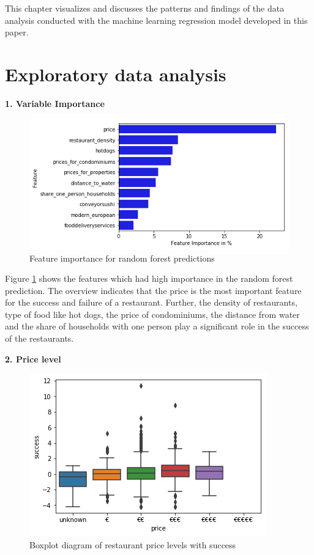\documentclass[a4paper, 11pt, oneside]{Thesis}  %
\begin{document}
This chapter visualizes and discusses the patterns and findings of the data analysis conducted with the machine learning regression model developed in this paper.

\section{Exploratory data analysis}
\label{Exploratory_data_analysis}

\textbf{1.	Variable Importance}

\begin{figure}[h]
\includegraphics[scale=0.7]{Figures/Exploratory/feature_importance_barplot.png}
\centering
\caption{Feature importance for random forest predictions}
\label{fig:feature_importance_barplot}
\end{figure}

Figure \ref{fig:feature_importance_barplot} shows the features which had high importance in the random forest prediction. The overview indicates that the price is the most important feature for the success and failure of a restaurant. Further, the density of restaurants, type of food like hot dogs, the price of condominiums, the distance from water and the share of households with one person play a significant role in the success of the restaurants.

\textbf{2.	Price level}

\begin{figure}[h]
\includegraphics[scale=0.7]{Figures/Exploratory/boxplot_price_levels.png}
\centering
\caption{Boxplot diagram of restaurant price levels with success}
\label{fig:boxplot_price_levels}
\end{figure}
\end{document}
